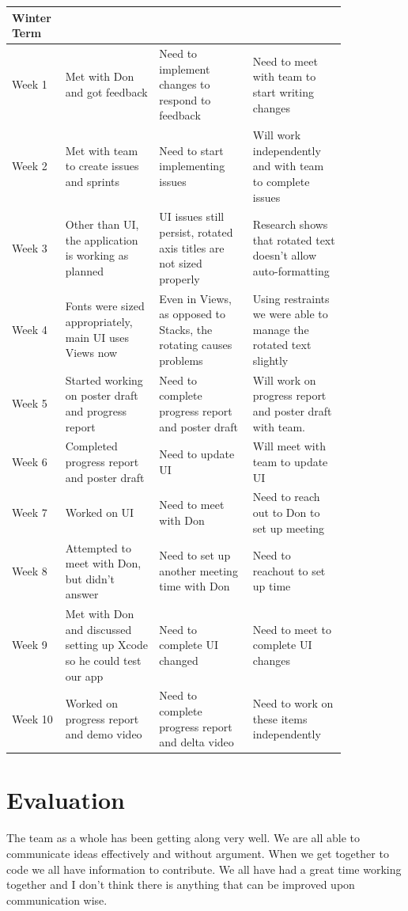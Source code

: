 \documentclass[onecolumn, draftclsnofoot,10pt, compsoc]{IEEEtran}
\begin{document}
\begin{center}
\begin{longtable}{| l | p{0.28\linewidth} | p{0.28\linewidth} | p{0.28\linewidth} |}
    Winter Term \\ \hline
    Week 1 & Met with Don and got feedback & Need to implement changes to respond to feedback & Need to meet with team to start writing changes \\ \hline
	Week 2 & Met with team to create issues and sprints & Need to start implementing issues & Will work independently and with team to complete issues \\ \hline
	Week 3 & Other than UI, the application is working as planned & UI issues still persist, rotated axis titles are not sized properly & Research shows that rotated text doesn't allow auto-formatting \\ \hline
	Week 4 & Fonts were sized appropriately, main UI uses Views now & Even in Views, as opposed to Stacks, the rotating causes problems & Using restraints we were able to manage the rotated text slightly \\ \hline
    Week 5 & Started working on poster draft and progress report & Need to complete progress report and poster draft & Will work on progress report and poster draft with team. \\ \hline
    Week 6 & Completed progress report and poster draft & Need to update UI & Will meet with team to update UI \\ \hline
    Week 7 & Worked on UI & Need to meet with Don & Need to reach out to Don to set up meeting \\ \hline
    Week 8 & Attempted to meet with Don, but didn't answer & Need to set up another meeting time with Don & Need to reachout to set up time \\ \hline
    Week 9 & Met with Don and discussed setting up Xcode so he could test our app & Need to complete UI changed & Need to meet to complete UI changes \\ \hline
    Week 10 & Worked on progress report and demo video & Need to complete progress report and delta video & Need to work on these items independently \\ \hline

\end{longtable}
\end{center}

\section{Evaluation}
The team as a whole has been getting along very well.
We are all able to communicate ideas effectively and without argument.
When we get together to code we all have information to contribute.
We all have had a great time working together and I don’t think there is anything that can be improved upon communication wise.
\end{document}
